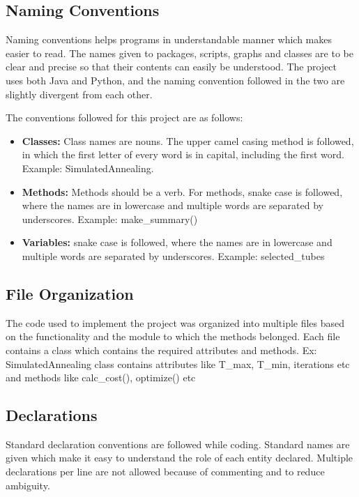     \subsection{Naming Conventions}

    Naming conventions helps programs in understandable manner which makes
    easier to read. The names given to packages, scripts, graphs and classes are
    to be clear and precise so that their contents can easily be understood. The
    project uses both Java and Python, and the naming convention followed in the
    two are slightly divergent from each other.

    The conventions followed for this project are as follows:

    \begin{itemize}
        \item \textbf{Classes:} Class names are nouns. The upper camel casing
        method is followed, in which the first letter of every word is in
        capital, including the first word. Example: SimulatedAnnealing.
        \item \textbf{Methods:} Methods should be a verb. For methods, snake
        case is followed, where the names are in lowercase and multiple words
        are separated by underscores. Example: make\_summary()
        \item \textbf{Variables:} snake case is followed, where the names are
        in lowercase and multiple words are separated by underscores.
        Example: selected\_tubes
    \end{itemize}

    \subsection{File Organization}
    The code used to implement the project was organized into multiple files
    based on the functionality and the module to which the methods belonged.
    Each file contains a class which contains the required attributes and
    methods.
    Ex: SimulatedAnnealing class contains attributes like T\_max, T\_min,
    iterations etc and methods like calc\_cost(), optimize() etc


    \subsection{Declarations}

    Standard declaration conventions are followed while coding. Standard names
    are given which make it easy to understand the role of each entity declared.
    Multiple declarations per line are not allowed because of commenting and to
    reduce ambiguity.

